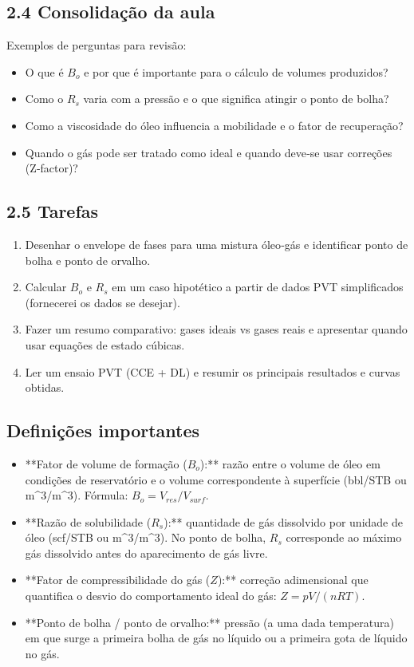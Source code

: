 \documentclass[11pt,a4paper]{article}
\begin{document}
\subsection{2.4 Consolidação da aula}
Exemplos de perguntas para revisão:
\begin{itemize}
\item O que é $B_o$ e por que é importante para o cálculo de volumes produzidos?
\item Como o $R_s$ varia com a pressão e o que significa atingir o ponto de bolha?
\item Como a viscosidade do óleo influencia a mobilidade e o fator de recuperação?
\item Quando o gás pode ser tratado como ideal e quando deve‑se usar correções (Z‑factor)?
\end{itemize}

\subsection{2.5 Tarefas}
\begin{enumerate}
\item Desenhar o envelope de fases para uma mistura óleo‑gás e identificar ponto de bolha e ponto de orvalho.
\item Calcular $B_o$ e $R_s$ em um caso hipotético a partir de dados PVT simplificados (fornecerei os dados se desejar).
\item Fazer um resumo comparativo: gases ideais vs gases reais e apresentar quando usar equações de estado cúbicas.
\item Ler um ensaio PVT (CCE + DL) e resumir os principais resultados e curvas obtidas.
\end{enumerate}

\subsection{Definições importantes}
\begin{itemize}
\item **Fator de volume de formação ($B_o$):** razão entre o volume de óleo em condições de reservatório e o volume correspondente à superfície (bbl/STB ou m^3/m^3). Fórmula: $B_o = V_{res}/V_{surf}$.
\item **Razão de solubilidade ($R_s$):** quantidade de gás dissolvido por unidade de óleo (scf/STB ou m^3/m^3). No ponto de bolha, $R_s$ corresponde ao máximo gás dissolvido antes do aparecimento de gás livre.
\item **Fator de compressibilidade do gás ($Z$):** correção adimensional que quantifica o desvio do comportamento ideal do gás: $Z = pV/(nRT)$.
\item **Ponto de bolha / ponto de orvalho:** pressão (a uma dada temperatura) em que surge a primeira bolha de gás no líquido ou a primeira gota de líquido no gás.
\end{itemize}
\end{document}
